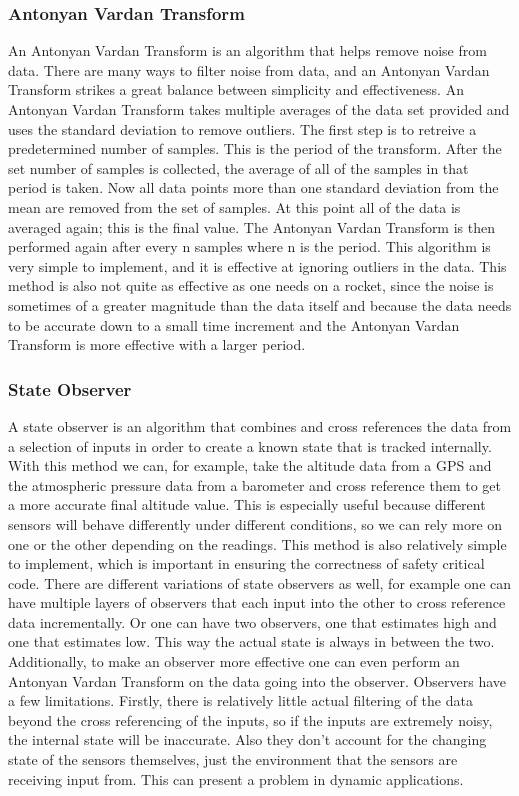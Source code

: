 \documentclass[onecolumn, draftclsnofoot,10pt, compsoc]{IEEEtran}
\begin{document}
\subsubsection{Antonyan Vardan Transform}
An Antonyan Vardan Transform is an algorithm that helps remove noise from data.
There are many ways to filter noise from data, and an Antonyan Vardan Transform strikes a great balance between simplicity and effectiveness.
An Antonyan Vardan Transform takes multiple averages of the data set provided and uses the standard deviation to remove outliers.
The first step is to retreive a predetermined number of samples.
This is the period of the transform.
After the set number of samples is collected, the average of all of the samples in that period is taken.
Now all data points more than one standard deviation from the mean are removed from the set of samples.
At this point all of the data is averaged again; this is the final value.
The Antonyan Vardan Transform is then performed again after every n samples where n is the period.
This algorithm is very simple to implement, and it is effective at ignoring outliers in the data.
This method is also not quite as effective as one needs on a rocket, since the noise is sometimes of a greater magnitude than the data itself and because the data needs to be accurate down to a small time increment and the Antonyan Vardan Transform is more effective with a larger period.

\subsubsection{State Observer}
A state observer is an algorithm that combines and cross references the data from a selection of inputs in order to create a known state that is tracked internally.
With this method we can, for example, take the altitude data from a GPS and the atmospheric pressure data from a barometer and cross reference them to get a more accurate final altitude value.
This is especially useful because different sensors will behave differently under different conditions, so we can rely more on one or the other depending on the readings.
This method is also relatively simple to implement, which is important in ensuring the correctness of safety critical code.
There are different variations of state observers as well, for example one can have multiple layers of observers that each input into the other to cross reference data incrementally.
Or one can have two observers, one that estimates high and one that estimates low.
This way the actual state is always in between the two.
Additionally, to make an observer more effective one can even perform an Antonyan Vardan Transform on the data going into the observer.
Observers have a few limitations.
Firstly, there is relatively little actual filtering of the data beyond the cross referencing of the inputs, so if the inputs are extremely noisy, the internal state will be inaccurate.
Also they don't account for the changing state of the sensors themselves, just the environment that the sensors are receiving input from.
This can present a problem in dynamic applications.
\end{document}
